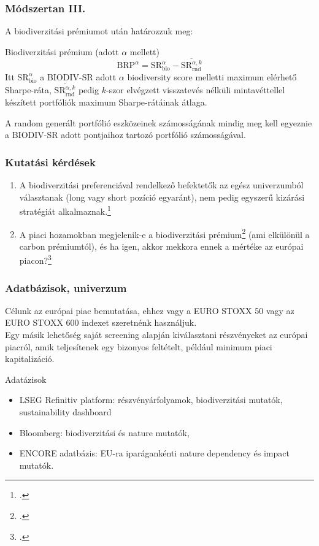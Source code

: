 \documentclass[aspectratio=169,notheorems]{corvinusmetropolis}
\begin{document}
\begin{frame}
  \frametitle{Módszertan III.}
  A biodiverzitási prémiumot \textcite{naffa_biodiversity_2024} után határozzuk meg:
  \begin{block}{Biodiverzitási prémium (adott $\alpha$ mellett)}
  \begin{equation}
    \text{BRP}^\alpha=\text{SR}^{\alpha}_{\text{bio}} - \overline{\text{SR}^{\alpha, k}_{\text{rnd}}}
  \end{equation}
  Itt $\text{SR}^{\alpha}_{\text{bio}}$ a BIODIV-SR adott $\alpha$ biodiversity score melletti maximum elérhető Sharpe-ráta,
  $\overline{\text{SR}^{\alpha, k}_{\text{rnd}}}$ pedig $k$-szor elvégzett visszatevés nélküli mintavéttellel készített portfóliók maximum Sharpe-rátáinak átlaga.
  \end{block}
  A random generált portfólió \alert{eszközeinek számosságának mindig meg kell egyeznie} a BIODIV-SR adott pontjaihoz tartozó portfólió számosságával.
\end{frame}

\begin{frame}
  \frametitle{Kutatási kérdések}
  \begin{enumerate}
    \item A biodiverzitási preferenciával rendelkező befektetők az egész univerzumból választanak (long vagy short pozíció egyaránt), nem pedig egyszerű kizárási stratégiát alkalmaznak.\footcite{pedersen_responsible_2021}\pause 
    \item A piaci hozamokban megjelenik-e a biodiverzitási prémium\footcite{coqueret_biodiversity_2024} (ami elkülönül a carbon prémiumtól), és ha igen, akkor mekkora ennek a mértéke az európai piacon?\footcite{naffa_biodiversity_2024}
  \end{enumerate}
\end{frame}

\begin{frame}
  \frametitle{Adatbázisok, univerzum}
  Célunk az európai piac bemutatása, ehhez vagy a \alert{EURO STOXX 50} vagy az \alert{EURO STOXX 600} indexet szeretnénk használjuk.\\
   Egy másik lehetőség \alert{saját screening alapján} kiválasztani részvényeket az európai piacról, amik \alert{teljesítenek egy bizonyos feltételt}, például minimum piaci kapitalizáció.\\
  \medskip
  \begin{block}{Adatázisok}
    \begin{itemize}
    \item \alert{LSEG Refinitiv platform}: részvényárfolyamok, biodiverzitási mutatók, sustainability dashboard
    \item \alert{Bloomberg}: biodiverzitási és nature mutatók,
      \item \alert{ENCORE adatbázis}: EU-ra iparágankénti nature dependency és impact mutatók.
    \end{itemize}
  \end{block}
\end{frame}
\end{document}
